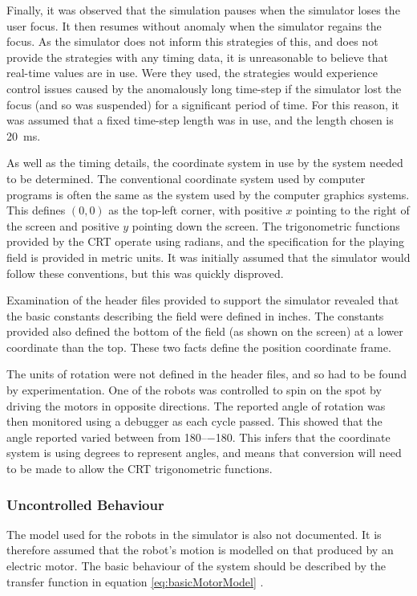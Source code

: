 \documentclass[10pt]{article} \usepackage[a4paper]{geometry}
\begin{document}
Finally, it was observed that the simulation pauses when the simulator loses the
user focus.  It then resumes without anomaly when the simulator regains the
focus.  As the simulator does not inform this strategies of this, and does not
provide the strategies with any timing data, it is unreasonable to believe that
real-time values are in use.  Were they used, the strategies would experience
control issues caused by the anomalously long time-step if the simulator lost
the focus (and so was suspended) for a significant period of time.  For this
reason, it was assumed that a fixed time-step length was in use, and the length
chosen is \SI{20}{\milli\second}.

As well as the timing details, the coordinate system in use by the system needed
to be determined.  The conventional coordinate system used by computer programs
is often the same as the system used by the computer graphics systems.  This
defines $\left(0,0\right)$ as the top-left corner, with positive $x$ pointing to
the right of the screen and positive $y$ pointing down the screen.  The
trigonometric functions provided by the \ac{CRT} operate using radians, and the
specification for the playing field is provided in metric units.  It was
initially assumed that the simulator would follow these conventions, but this
was quickly disproved.

Examination of the header files provided to support the simulator revealed that
the basic constants describing the field were defined in inches. The constants
provided also defined the bottom of the field (as shown on the screen) at a
lower coordinate than the top.  These two facts define the position coordinate
frame.

The units of rotation were not defined in the header files, and so had to be
found by experimentation.  One of the robots was controlled to spin on the spot
by driving the motors in opposite directions.  The reported angle of rotation
was then monitored using a debugger as each cycle passed.  This showed that the
angle reported varied between from \numrange{+180}{-180}.  This infers that the
coordinate system is using degrees to represent angles, and means that
conversion will need to be made to allow the \ac{CRT} trigonometric functions.

\subsubsection{Uncontrolled Behaviour}

The model used for the robots in the simulator is also not documented. It is
therefore assumed that the robot's motion is modelled on that produced by an
electric motor. The basic behaviour of the system should be described by the
transfer function in equation \ref{eq:basicMotorModel} \cite{basicControlNotes}.
\end{document}
